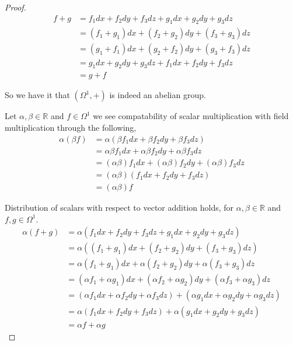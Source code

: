 \documentclass[12pt]{article}
\newcommand      {\Rm}         {{\mathbb R}}
\newcommand {\f}[1]{{#1_1 dx + #1_2 dy + #1_3 dz}}
\begin{document}
\begin{itemize}
\begin{itemize}
\begin{proof}
                \begin{align*}
                    f + g &= \f{f} + \f{g} \\
                        &= (f_1 + g_1)dx + (f_2 + g_2)dy + (f_3 + g_3)dz \\
                        &= (g_1 + f_1)dx + (g_2 + f_2)dy + (g_3 + f_3)dz \\
                        &= \f{g} + \f{f} \\
                        &= g + f
                \end{align*}

                So we have it that $(\Omega^1,+)$ is indeed an abelian group.

                Let $\alpha,\beta \in \Rm$ and $f\in \Omega^1$ we see compatability of scalar multiplication with field multiplication through the following,
                \begin{align*}
                    \alpha(\beta f) &= \alpha(\f{\beta f}) \\
                    &= \f{\alpha \beta f} \\
                    &= \f{(\alpha\beta) f} \\
                    &= (\alpha\beta)(\f{f}) \\
                    &= (\alpha\beta)f
                \end{align*}
      
                Distribution of scalars with respect to vector addition holds, for $\alpha,\beta \in \Rm$ and $f,g\in \Omega^1$.
                \begin{align*}
                    \alpha(f + g) &= \alpha(\f{f} + \f{g}) \\
                    &= \alpha((f_1 + g_1)dx + (f_2 + g_2)dy + (f_3 + g_3)dz) \\ 
                    &= \alpha(f_1 + g_1)dx + \alpha(f_2 + g_2)dy + \alpha(f_3 + g_3)dz \\
                    &= (\alpha f_1 + \alpha g_1)dx + (\alpha f_2 + \alpha g_2)dy + (\alpha f_3 + \alpha g_3)dz \\
                    &= (\f{\alpha f}) + (\f{\alpha g}) \\
                    &= \alpha(\f{f}) + \alpha(\f{g}) \\
                    &= \alpha f + \alpha g
                \end{align*}


\end{proof}
\end{itemize}
\end{itemize}
\end{document}
